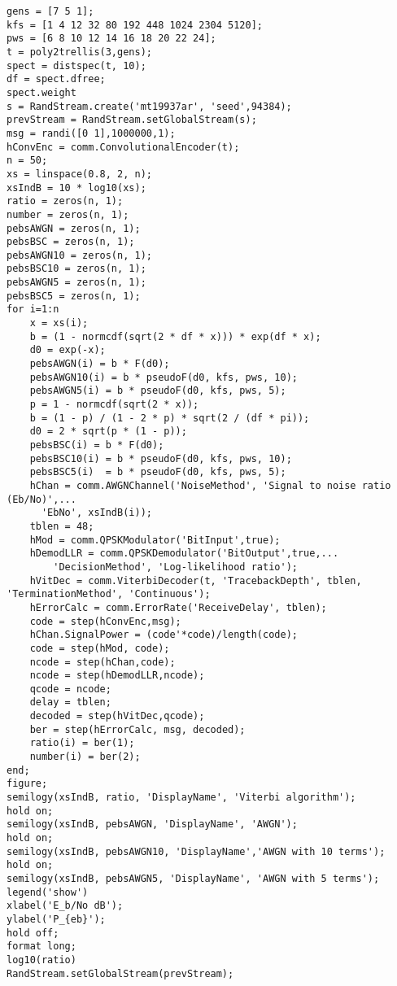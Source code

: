 \documentclass{article}
\begin{document}
\begin{lstlisting}[frame=single]
gens = [7 5 1];
kfs = [1 4 12 32 80 192 448 1024 2304 5120];
pws = [6 8 10 12 14 16 18 20 22 24];
t = poly2trellis(3,gens);
spect = distspec(t, 10);
df = spect.dfree;
spect.weight
s = RandStream.create('mt19937ar', 'seed',94384);
prevStream = RandStream.setGlobalStream(s);
msg = randi([0 1],1000000,1);
hConvEnc = comm.ConvolutionalEncoder(t);
n = 50;
xs = linspace(0.8, 2, n);
xsIndB = 10 * log10(xs);
ratio = zeros(n, 1);
number = zeros(n, 1);
pebsAWGN = zeros(n, 1);
pebsBSC = zeros(n, 1);
pebsAWGN10 = zeros(n, 1);
pebsBSC10 = zeros(n, 1);
pebsAWGN5 = zeros(n, 1);
pebsBSC5 = zeros(n, 1);
for i=1:n
    x = xs(i);
    b = (1 - normcdf(sqrt(2 * df * x))) * exp(df * x);
    d0 = exp(-x);
    pebsAWGN(i) = b * F(d0);
    pebsAWGN10(i) = b * pseudoF(d0, kfs, pws, 10);
    pebsAWGN5(i) = b * pseudoF(d0, kfs, pws, 5);
    p = 1 - normcdf(sqrt(2 * x));
    b = (1 - p) / (1 - 2 * p) * sqrt(2 / (df * pi));
    d0 = 2 * sqrt(p * (1 - p));
    pebsBSC(i) = b * F(d0);
    pebsBSC10(i) = b * pseudoF(d0, kfs, pws, 10);
    pebsBSC5(i)  = b * pseudoF(d0, kfs, pws, 5);
    hChan = comm.AWGNChannel('NoiseMethod', 'Signal to noise ratio (Eb/No)',...
      'EbNo', xsIndB(i));
    tblen = 48; 
    hMod = comm.QPSKModulator('BitInput',true);
    hDemodLLR = comm.QPSKDemodulator('BitOutput',true,...
        'DecisionMethod', 'Log-likelihood ratio');
    hVitDec = comm.ViterbiDecoder(t, 'TracebackDepth', tblen, 'TerminationMethod', 'Continuous');
    hErrorCalc = comm.ErrorRate('ReceiveDelay', tblen);
    code = step(hConvEnc,msg);
    hChan.SignalPower = (code'*code)/length(code);
    code = step(hMod, code);
    ncode = step(hChan,code);
    ncode = step(hDemodLLR,ncode);
    qcode = ncode;
    delay = tblen;
    decoded = step(hVitDec,qcode);
    ber = step(hErrorCalc, msg, decoded);
    ratio(i) = ber(1);
    number(i) = ber(2);
end;
figure;
semilogy(xsIndB, ratio, 'DisplayName', 'Viterbi algorithm');
hold on;
semilogy(xsIndB, pebsAWGN, 'DisplayName', 'AWGN');
hold on;
semilogy(xsIndB, pebsAWGN10, 'DisplayName','AWGN with 10 terms');
hold on;
semilogy(xsIndB, pebsAWGN5, 'DisplayName', 'AWGN with 5 terms');
legend('show')
xlabel('E_b/No dB');
ylabel('P_{eb}');
hold off;
format long;
log10(ratio)
RandStream.setGlobalStream(prevStream);
\end{lstlisting}
%
\end{document}
